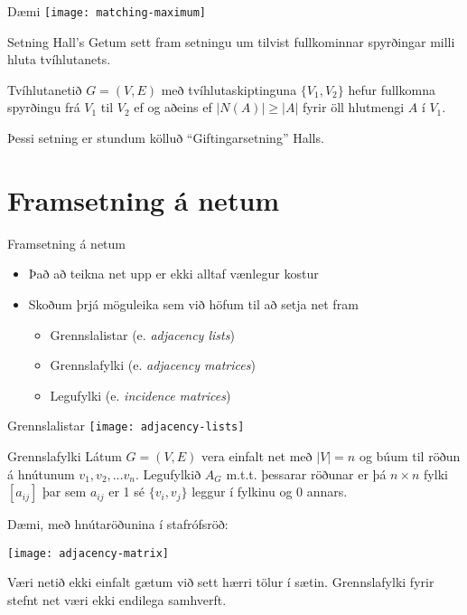 \documentclass[handout]{beamer}
\begin{document}
\begin{frame}{Dæmi}
\texttt{[image: matching-maximum]}
\end{frame}

\begin{frame}{Setning Hall's}
Getum sett fram setningu um tilvist fullkominnar spyrðingar milli hluta tvíhlutanets.

\begin{tcolorbox}[title=Setning Halls]
Tvíhlutanetið $G = (V, E)$ með tvíhlutaskiptinguna $\{V_1, V_2\}$ hefur fullkomna spyrðingu frá $V_1$ til $V_2$ ef og aðeins ef $|N(A)| \geq |A|$ fyrir öll hlutmengi $A$ í $V_1$.
\end{tcolorbox}

Þessi setning er stundum kölluð ``Giftingarsetning'' Halls.
\end{frame}

\section{Framsetning á netum}

\begin{frame}{Framsetning á netum}
\begin{itemize}
 \item Það að teikna net upp er ekki alltaf vænlegur kostur
 \item Skoðum þrjá möguleika sem við höfum til að setja net fram
 \begin{itemize}
  \item Grennslalistar (e. \emph{adjacency lists})
  \item Grennslafylki (e. \emph{adjacency matrices})
  \item Legufylki (e. \emph{incidence matrices})
 \end{itemize}
\end{itemize}
\end{frame}

\begin{frame}{Grennslalistar}
\texttt{[image: adjacency-lists]}
\end{frame}

\begin{frame}{Grennslafylki}
Látum $G = (V, E)$ vera einfalt net með $|V| = n$ og búum til röðun á hnútunum $v_1, v_2, \ldots v_n$. Legufylkið $A_G$ m.t.t. þessarar röðunar er þá $n \times n$ fylki $[a_{ij}]$ þar sem $a_{ij}$ er 1 sé $\{v_i,v_j\}$ leggur í fylkinu og 0 annars.

Dæmi, með hnútaröðunina í stafrófsröð:
\begin{center}
\texttt{[image: adjacency-matrix]}
\end{center}
Væri netið ekki einfalt gætum við sett hærri tölur í sætin. Grennslafylki fyrir stefnt net væri ekki endilega samhverft.
\end{frame}
\end{document}
